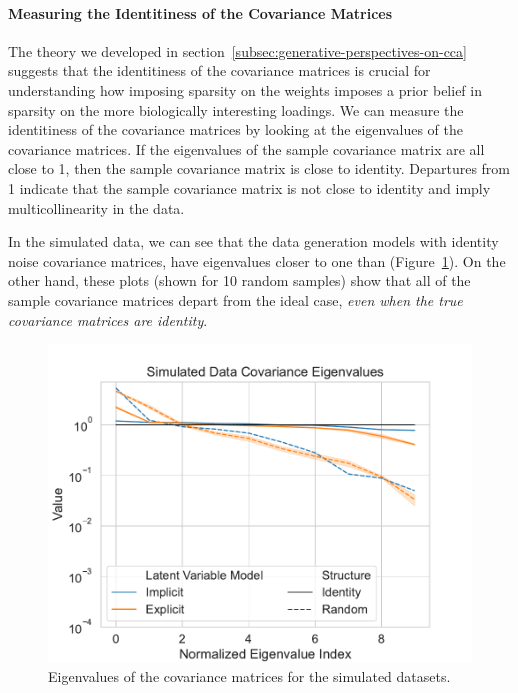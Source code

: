 \paragraph{Measuring the Identitiness of the Covariance Matrices}

The theory we developed in section~\ref{subsec:generative-perspectives-on-cca} suggests that the identitiness of the covariance matrices is crucial for understanding how imposing sparsity on the weights imposes a prior belief in sparsity on the more biologically interesting loadings.
We can measure the identitiness of the covariance matrices by looking at the eigenvalues of the covariance matrices.
If the eigenvalues of the sample covariance matrix are all close to 1, then the sample covariance matrix is close to identity.
Departures from 1 indicate that the sample covariance matrix is not close to identity and imply multicollinearity in the data.

In the simulated data, we can see that the data generation models with identity noise covariance matrices, have eigenvalues closer to one than (Figure~\ref{fig:covariance-eigenvalues-simulated-low}).
On the other hand, these plots (shown for 10 random samples) show that all of the sample covariance matrices depart from the ideal case, \textit{even when the true covariance matrices are identity}.

\begin{figure}
\centering
\includegraphics[width=0.8\linewidth]{figures/regularization/covariance/simulated_covariance_eigenvalues_low}
\caption{Eigenvalues of the covariance matrices for the simulated datasets.}\label{fig:covariance-eigenvalues-simulated-low}
\end{figure}

